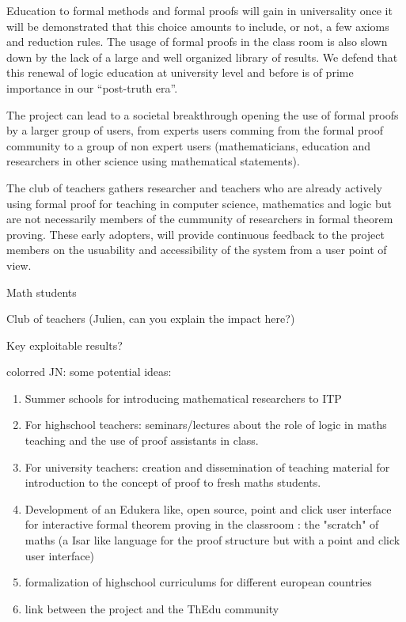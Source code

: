 Education to formal methods and formal proofs will gain in universality once it will be demonstrated that this choice amounts to include, or not, a few axioms and reduction
rules. 
The usage of formal proofs in the class room is also slown down by the lack of a large and well organized library of results.
We defend that this renewal of logic education at university level and before is of prime importance in our ``post-truth era''.

The project can lead to a societal breakthrough opening the use of formal proofs by a larger group of users, from experts users comming from the formal proof community  to a group of non expert users (mathematicians, education and researchers in other science using mathematical statements). 

The club of teachers gathers researcher and teachers who are already actively using formal proof for teaching in computer science, mathematics and logic but are not necessarily members of the cummunity of researchers in formal theorem proving. These early adopters, will provide continuous feedback to the project members on the usuability and accessibility of the system from a user point of view.

Math students 

{\color{red} Club of teachers (Julien, can you explain the impact here?)}

{\color{red} Key exploitable results?}

{color{red} JN:  some potential ideas:}
\begin{enumerate}
\item Summer schools for introducing mathematical researchers to ITP
\item For highschool teachers: seminars/lectures about  the role of logic in maths teaching and the use of proof assistants in class.
\item For university teachers: creation and dissemination of teaching material for introduction to the concept of proof to fresh maths students.   
\item Development of an Edukera like, open source, point and click user interface for interactive formal theorem proving in the classroom : the "scratch" of maths  (a Isar like language for the proof structure but with a point and click user interface)
\item formalization of  highschool curriculums for different european countries
\item link between the project and the ThEdu community
\end{enumerate}

